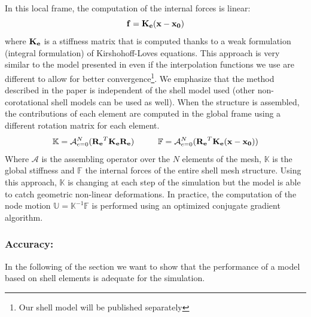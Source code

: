 In this local frame, the computation of the internal forces is linear:
\begin{equation}
  \mathbf{f} = \mathbf{K_e}(\mathbf{x} - \mathbf{x_0})
 \label{linear_static_model} 
\end{equation}
where $\mathbf{K_e}$ is a stiffness matrix that is computed thanks to a weak formulation (integral formulation) of Kirshohoff-Loves equations.
This approach is very similar to the model presented in  \cite{Comas2010b,Comas2010c}  even if the interpolation functions we use are  different to allow for better convergence\footnote{Our shell model will be published separately}. 
We emphasize that the method described in the paper is independent of the shell model used (other non-corotational shell models can be used as well).
%
When the structure is assembled, the contributions of each element are computed in the global frame using a different rotation matrix for each element.
\begin{equation}
\mathbb{K} = \mathcal{A}_{e=0}^N (\mathbf{R_e}^T \mathbf{K_e} \mathbf{R_e}) \hspace{10mm}
\mathbb{F} = \mathcal{A}_{e=0}^N ( \mathbf{R_e}^T \mathbf{K_e}(\myvec{x} - \myvec{x_0}))
\end{equation}
Where $\mathcal{A}$ is the assembling operator over the $N$ elements of the mesh, $\mathbb{K}$ is the global stiffness and $\mathbb{F}$ the internal forces of the entire shell mesh structure. 
Using this approach, $\mathbb{K}$ is changing at each step of the simulation but the model is able to catch geometric non-linear deformations.
In practice, the computation of the node motion $\mathbb{U} = \mathbb{K}^{-1} \mathbb{F}$ is performed using an optimized conjugate gradient algorithm.


\subsubsection{Accuracy: } 
In the following of the section we want to show that the performance of a model
based on shell elements is adequate for the simulation.

